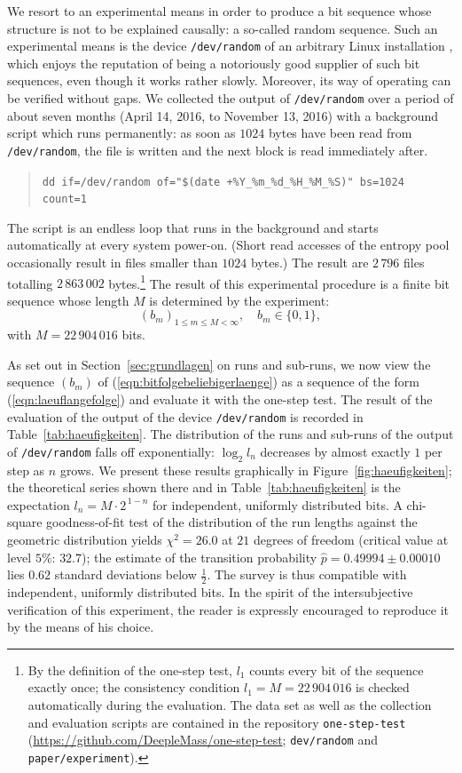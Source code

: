 \documentclass[11pt,a4paper]{scrartcl}
\theoremstyle{plain}
\theoremstyle{definition}
\theoremstyle{remark}
\begin{document}
We resort to an experimental means in order to produce a bit sequence
whose structure is not to be explained causally: a so-called random
sequence. Such an experimental means is the device
\texttt{/dev/random} of an arbitrary Linux installation
\cite{gutterman2004}, which enjoys the reputation of being a
notoriously good supplier of such bit sequences, even though it works
rather slowly. Moreover, its way of operating can be verified
without gaps. We collected the output of \texttt{/dev/random} over a
period of about seven months (April 14, 2016, to November 13,
2016) with a background script which runs permanently: as soon as
$1024$ bytes have been read from \texttt{/dev/random}, the file is
written and the next block is read immediately after.
\begin{quote}
\verb|dd if=/dev/random of="$(date +%Y_%m_%d_%H_%M_%S)" bs=1024 count=1|
\end{quote}
The script is an endless loop that runs in the background and starts
automatically at every system power-on. (Short read accesses of the
entropy pool occasionally result in files smaller than $1024$
bytes.) The result are $2\,796$ files totalling
$2\,863\,002$ bytes.\footnote{By the definition of the one-step test,
$l_1$ counts every bit of the sequence exactly once; the consistency
condition $l_1=M=22\,904\,016$ is checked automatically during the
evaluation. The data set as well as the collection and evaluation
scripts are contained in the repository \texttt{one-step-test}
(\url{https://github.com/DeepleMass/one-step-test}; \texttt{dev/random}
and \texttt{paper/experiment}).}
The result of this experimental procedure is a finite bit sequence
whose length $M$ is determined by the experiment:
\begin{equation}\label{eqn:bitfolgebeliebigerlaenge}
  (b_m)_{1\leq m\leq M<\infty},\quad b_m\in\{0,1\},
\end{equation}
with $M=22\,904\,016$ bits.

\noindent As set out in Section~\ref{sec:grundlagen} on runs and
sub-runs, we now view the sequence $(b_m)$ of
(\ref{eqn:bitfolgebeliebigerlaenge}) as a sequence of the form
(\ref{eqn:laeuflangefolge}) and evaluate it with the one-step test.
The result of the evaluation of the output of the device
\texttt{/dev/random} is recorded in Table~\ref{tab:haeufigkeiten}.
The distribution of the runs and sub-runs of the output of
\texttt{/dev/random} falls off exponentially: $\log_2 l_n$ decreases
by almost exactly $1$ per step as $n$ grows. We present these results
graphically in Figure~\ref{fig:haeufigkeiten}; the theoretical series
shown there and in Table~\ref{tab:haeufigkeiten} is the expectation
$l_n=M\cdot 2^{\,1-n}$ for independent, uniformly distributed bits. A
chi-square goodness-of-fit test of the distribution of the run
lengths against the geometric distribution yields $\chi^2=26.0$ at
$21$ degrees of freedom (critical value at level $5\%$: $32.7$); the
estimate of the transition probability
$\hat p=0.49994\pm 0.00010$ lies $0.62$ standard deviations below
$\tfrac12$. The survey is thus compatible with independent, uniformly
distributed bits. In the spirit of the intersubjective verification of
this experiment, the reader is expressly encouraged to reproduce it by
the means of his choice.
\end{document}
